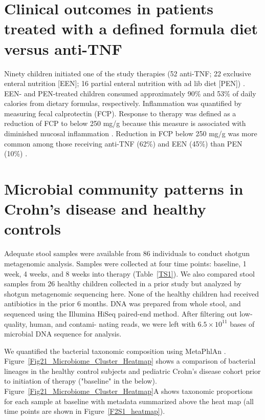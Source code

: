 \section{Clinical outcomes in patients treated with a defined formula diet versus anti-TNF}
Ninety children initiated one of the study therapies (52 anti-TNF; 22 exclusive enteral nutrition [EEN]; 16 partial enteral nutrition with ad lib diet [PEN]) \citep{lee2015comparative}. EEN- and PEN-treated children consumed approximately 90\% and 53\% of daily calories from dietary formulas, respectively. Inflammation was quantified by measuring fecal calprotectin (FCP). Response to therapy was defined as a reduction of FCP to below 250 mg/g because this measure is associated with diminished mucosal inflammation \citep{Lin:2014hm}. Reduction in FCP below 250 mg/g was more common among those receiving anti-TNF (62\%) and EEN (45\%) than PEN (10\%) \citep{lee2015comparative}.



\section{Microbial community patterns in Crohn's disease and healthy controls}
Adequate stool samples were available from 86 individuals to conduct shotgun metagenomic analysis. Samples were collected at four time points: baseline, 1 week, 4 weeks, and 8 weeks into therapy (Table~\ref{TS1}). We also compared stool samples from 26 healthy children collected in a prior study \citep{wu2011linking} but analyzed by shotgun metagenomic sequencing here. None of the healthy children had received antibiotics in the prior 6 months. DNA was prepared from whole stool, and sequenced using the Illumina HiSeq paired-end method. After filtering out low-quality, human, and contami- nating reads, we were left with $6.5 \times 10^{11}$ bases of microbial DNA sequence for analysis.



We quantified the bacterial taxonomic composition using MetaPhlAn \citep{segata2012metagenomic}. Figure~\ref{Fig21_Microbiome_Cluster_Heatmap} shows a comparison of bacterial lineages in the healthy control subjects and pediatric Crohn's disease cohort prior to initiation of therapy ("baseline" in the below). Figure~\ref{Fig21_Microbiome_Cluster_Heatmap}A shows taxonomic proportions for each sample at baseline with metadata summarized above the heat map (all time points are shown in Figure~\ref{F2S1_heatmap}). 


